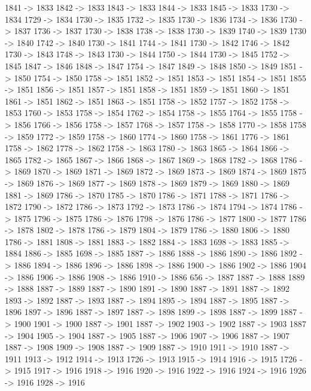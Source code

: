 {	1841 -> 1833
	1842 -> 1833
	1843 -> 1833
	1844 -> 1833
	1845 -> 1833
	1730 -> 1834
	1729 -> 1834
	1730 -> 1835
	1732 -> 1835
	1730 -> 1836
	1734 -> 1836
	1730 -> 1837
	1736 -> 1837
	1730 -> 1838
	1738 -> 1838
	1730 -> 1839
	1740 -> 1839
	1730 -> 1840
	1742 -> 1840
	1730 -> 1841
	1744 -> 1841
	1730 -> 1842
	1746 -> 1842
	1730 -> 1843
	1748 -> 1843
	1730 -> 1844
	1750 -> 1844
	1730 -> 1845
	1752 -> 1845
	1847 -> 1846
	1848 -> 1847
	1754 -> 1847
	1849 -> 1848
	1850 -> 1849
	1851 -> 1850
	1754 -> 1850
	1758 -> 1851
	1852 -> 1851
	1853 -> 1851
	1854 -> 1851
	1855 -> 1851
	1856 -> 1851
	1857 -> 1851
	1858 -> 1851
	1859 -> 1851
	1860 -> 1851
	1861 -> 1851
	1862 -> 1851
	1863 -> 1851
	1758 -> 1852
	1757 -> 1852
	1758 -> 1853
	1760 -> 1853
	1758 -> 1854
	1762 -> 1854
	1758 -> 1855
	1764 -> 1855
	1758 -> 1856
	1766 -> 1856
	1758 -> 1857
	1768 -> 1857
	1758 -> 1858
	1770 -> 1858
	1758 -> 1859
	1772 -> 1859
	1758 -> 1860
	1774 -> 1860
	1758 -> 1861
	1776 -> 1861
	1758 -> 1862
	1778 -> 1862
	1758 -> 1863
	1780 -> 1863
	1865 -> 1864
	1866 -> 1865
	1782 -> 1865
	1867 -> 1866
	1868 -> 1867
	1869 -> 1868
	1782 -> 1868
	1786 -> 1869
	1870 -> 1869
	1871 -> 1869
	1872 -> 1869
	1873 -> 1869
	1874 -> 1869
	1875 -> 1869
	1876 -> 1869
	1877 -> 1869
	1878 -> 1869
	1879 -> 1869
	1880 -> 1869
	1881 -> 1869
	1786 -> 1870
	1785 -> 1870
	1786 -> 1871
	1788 -> 1871
	1786 -> 1872
	1790 -> 1872
	1786 -> 1873
	1792 -> 1873
	1786 -> 1874
	1794 -> 1874
	1786 -> 1875
	1796 -> 1875
	1786 -> 1876
	1798 -> 1876
	1786 -> 1877
	1800 -> 1877
	1786 -> 1878
	1802 -> 1878
	1786 -> 1879
	1804 -> 1879
	1786 -> 1880
	1806 -> 1880
	1786 -> 1881
	1808 -> 1881
	1883 -> 1882
	1884 -> 1883
	1698 -> 1883
	1885 -> 1884
	1886 -> 1885
	1698 -> 1885
	1887 -> 1886
	1888 -> 1886
	1890 -> 1886
	1892 -> 1886
	1894 -> 1886
	1896 -> 1886
	1898 -> 1886
	1900 -> 1886
	1902 -> 1886
	1904 -> 1886
	1906 -> 1886
	1908 -> 1886
	1910 -> 1886
	656 -> 1887
	1887 -> 1888
	1889 -> 1888
	1887 -> 1889
	1887 -> 1890
	1891 -> 1890
	1887 -> 1891
	1887 -> 1892
	1893 -> 1892
	1887 -> 1893
	1887 -> 1894
	1895 -> 1894
	1887 -> 1895
	1887 -> 1896
	1897 -> 1896
	1887 -> 1897
	1887 -> 1898
	1899 -> 1898
	1887 -> 1899
	1887 -> 1900
	1901 -> 1900
	1887 -> 1901
	1887 -> 1902
	1903 -> 1902
	1887 -> 1903
	1887 -> 1904
	1905 -> 1904
	1887 -> 1905
	1887 -> 1906
	1907 -> 1906
	1887 -> 1907
	1887 -> 1908
	1909 -> 1908
	1887 -> 1909
	1887 -> 1910
	1911 -> 1910
	1887 -> 1911
	1913 -> 1912
	1914 -> 1913
	1726 -> 1913
	1915 -> 1914
	1916 -> 1915
	1726 -> 1915
	1917 -> 1916
	1918 -> 1916
	1920 -> 1916
	1922 -> 1916
	1924 -> 1916
	1926 -> 1916
	1928 -> 1916
}

